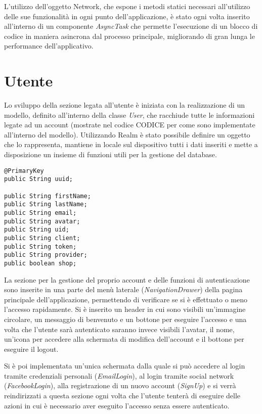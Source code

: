 L'utilizzo dell'oggetto Network, che espone i metodi statici necessari
all'utilizzo delle sue funzionalità in ogni punto dell'applicazione,
è stato ogni volta inserito all'interno di un componente \emph{AsyncTask}
che permette l'esecuzione di un blocco di codice in maniera asincrona
dal processo principale, migliorando di gran lunga le performance
dell'applicativo.

\section{Utente}

Lo sviluppo della sezione legata all'utente è iniziata con la realizzazione
di un modello, definito all'interno della classe \emph{User}, che
racchiude tutte le informazioni legate ad un account (mostrate nel
codice CODICE per come sono implementate all'interno del modello).
Utilizzando Realm è stato possibile definire un oggetto che lo rappresenta,
mantiene in locale sul dispositivo tutti i dati inseriti e mette a
disposizione un insieme di funzioni utili per la gestione del database.

\begin{lstlisting}
@PrimaryKey
public String uuid;

public String firstName;
public String lastName;
public String email;
public String avatar;
public String uid;
public String client;
public String token;
public String provider;
public boolean shop;
\end{lstlisting}
La sezione per la gestione del proprio account e delle funzioni di
autenticazione sono inserite in una parte del menù laterale (\emph{NavigationDrawer})
della pagina principale dell'applicazione, permettendo di verificare
se si è effettuato o meno l'accesso rapidamente. Si è inserito un
header in cui sono visibili un'immagine circolare, un messaggio di
benvenuto e un bottone per eseguire l'accesso e una volta che l'utente
sarà autenticato saranno invece visibili l'avatar, il nome, un'icona
per accedere alla schermata di modifica dell'account e il bottone
per eseguire il logout.

Si è poi implementata un'unica schermata dalla quale si può accedere
al login tramite credenziali personali (\emph{EmailLogin}), al login
tramite social network (\emph{FacebookLogin}), alla registrazione
di un nuovo account (\emph{SignUp}) e si verrà reindirizzati a questa
sezione ogni volta che l'utente tenterà di eseguire delle azioni in
cui è necessario aver eseguito l'accesso senza essere autenticato.

